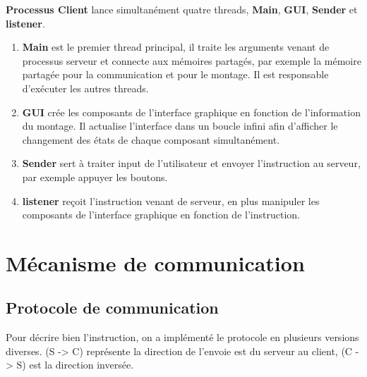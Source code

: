 \documentclass[14px]{article}
\begin{document}
	\textbf{Processus Client} lance simultanément quatre threads, \textbf{Main}, \textbf{GUI}, \textbf{Sender} et \textbf{listener}.
	\begin{enumerate}
		\item \textbf{Main} est le premier thread principal, il traite les arguments venant de processus serveur et connecte aux mémoires partagés, par exemple la mémoire partagée pour la communication et pour le montage. Il est responsable d'exécuter les autres threads.
		\item \textbf{GUI} crée les composants de l'interface graphique en fonction de l'information du montage. Il actualise l'interface dans un boucle infini afin d'afficher le changement des états de chaque composant simultanément.
		\item \textbf{Sender} sert à traiter input de l'utilisateur et envoyer l'instruction au serveur, par exemple appuyer les boutons.
		\item \textbf{listener} reçoit l'instruction venant de serveur, en plus manipuler les composants de l'interface graphique en fonction de l'instruction.
	\end{enumerate}
	
	
	\pagestyle{fancy}
	\rhead{\thepage}
	\fancyfoot{}
	
	\section{Mécanisme de communication}
	\subsection{Protocole de communication}
	Pour décrire bien l'instruction, on a implémenté le protocole en plusieurs versions diverses. (S -> C) représente la direction de l'envoie est du serveur au client, (C -> S) est la direction inversée.
	
\end{document}
